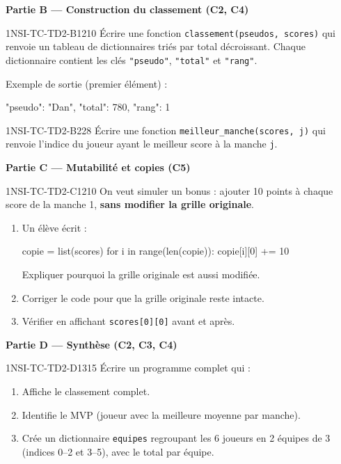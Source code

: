 \textbf{Partie B --- Construction du classement (C2, C4)}

\begin{exercice}{1NSI-TC-TD2-B1}{2}{10}
Écrire une fonction \lstinline{classement(pseudos, scores)} qui renvoie un
tableau de dictionnaires triés par total décroissant. Chaque dictionnaire
contient les clés \lstinline{"pseudo"}, \lstinline{"total"} et
\lstinline{"rang"}.

Exemple de sortie (premier élément) :
\begin{python}
{"pseudo": "Dan", "total": 780, "rang": 1}
\end{python}
\end{exercice}

\begin{exercice}{1NSI-TC-TD2-B2}{2}{8}
Écrire une fonction \lstinline{meilleur_manche(scores, j)} qui renvoie
l'indice du joueur ayant le meilleur score à la manche \lstinline{j}.
\end{exercice}

\textbf{Partie C --- Mutabilité et copies (C5)}

\begin{exercice}{1NSI-TC-TD2-C1}{2}{10}
On veut simuler un bonus : ajouter 10 points à chaque score de la manche 1,
\textbf{sans modifier la grille originale}.

\begin{enumerate}
  \item Un élève écrit :
\begin{python}
copie = list(scores)
for i in range(len(copie)):
    copie[i][0] += 10
\end{python}
        Expliquer pourquoi la grille originale est aussi modifiée.
  \item Corriger le code pour que la grille originale reste intacte.
  \item Vérifier en affichant \lstinline{scores[0][0]} avant et après.
\end{enumerate}
\end{exercice}

\textbf{Partie D --- Synthèse (C2, C3, C4)}

\begin{exercice}{1NSI-TC-TD2-D1}{3}{15}
Écrire un programme complet qui :
\begin{enumerate}
  \item Affiche le classement complet.
  \item Identifie le MVP (joueur avec la meilleure moyenne par manche).
  \item Crée un dictionnaire \lstinline{equipes} regroupant les 6 joueurs
        en 2 équipes de 3 (indices 0--2 et 3--5), avec le total par équipe.
\end{enumerate}
\end{exercice}

